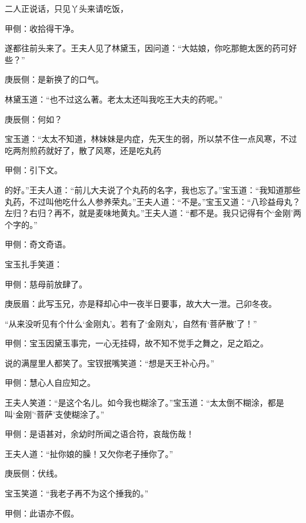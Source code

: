 \begin{parag}
    二人正说话，只见丫头来请吃饭，\begin{note}甲侧：收拾得干净。\end{note}遂都往前头来了。王夫人见了林黛玉，因问道：“大姑娘，你吃那鲍太医的药可好些？”\begin{note}庚辰侧：是新换了的口气。\end{note}林黛玉道：“也不过这么著。老太太还叫我吃王大夫的药呢。”\begin{note}庚辰侧：何如？\end{note}宝玉道：“太太不知道，林妹妹是内症，先天生的弱，所以禁不住一点风寒，不过吃两剂煎药就好了，散了风寒，还是吃丸药\begin{note}甲侧：引下文。\end{note}的好。”王夫人道：“前儿大夫说了个丸药的名字，我也忘了。”宝玉道：“我知道那些丸药，不过叫他吃什么人参养荣丸。”王夫人道：“不是。”宝玉又道：“八珍益母丸？左归？右归？再不，就是麦味地黄丸。”王夫人道：“都不是。我只记得有个‘金刚’两个字的。”\begin{note}甲侧：奇文奇语。\end{note}宝玉扎手笑道：\begin{note}甲侧：慈母前放肆了。\end{note}\begin{note}庚辰眉：此写玉兄，亦是释却心中一夜半日要事，故大大一泄。己卯冬夜。\end{note}“从来没听见有个什么‘金刚丸’。若有了‘金刚丸’，自然有‘菩萨散’了！”\begin{note}甲侧：宝玉因黛玉事完，一心无挂碍，故不知不觉手之舞之，足之蹈之。\end{note}说的满屋里人都笑了。宝钗抿嘴笑道：“想是天王补心丹。”\begin{note}甲侧：慧心人自应知之。\end{note}王夫人笑道：“是这个名儿。如今我也糊涂了。”宝玉道：“太太倒不糊涂，都是叫‘金刚’‘菩萨’支使糊涂了。”\begin{note}甲侧：是语甚对，余幼时所闻之语合符，哀哉伤哉！\end{note}王夫人道：“扯你娘的臊！又欠你老子捶你了。”\begin{note}庚辰侧：伏线。\end{note}宝玉笑道：“我老子再不为这个捶我的。”\begin{note}甲侧：此语亦不假。\end{note}
\end{parag}


